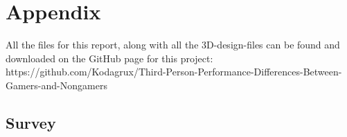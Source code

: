 \documentclass[runningheads,a4paper,oribibl]{llncs}
\begin{document}

%



\appendix

\section{Appendix}
All the files for this report, along with all the 3D-design-files can be found and downloaded on the GitHub page for this project: https://github.com/Kodagrux/Third-Person-Performance-Differences-Between-Gamers-and-Nongamers 
\subsection{Survey} \label{subsec:Survey}

\end{document}
